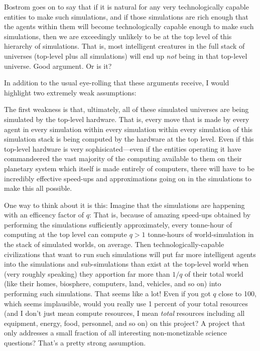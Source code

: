 \documentclass[12pt,letterpaper]{article}
\begin{document}
Bostrom goes on to say that if it is natural for any very
technologically capable entities to make such simulations, and if
those simulations are rich enough that the agents within them will
become technologically capable enough to make such simulations, then
we are exceedingly unlikely to be at the top level of this hierarchy
of simulations. That is, most intelligent creatures in the full stack
of universes (top-level plus all simulations) will end up \emph{not}
being in that top-level universe. Good argument. Or is it?

In addition to the usual eye-rolling that these arguments receive, I
would highlight two extremely weak assumptions:

The first weakness is that, ultimately, all of these simulated
universes are being simulated by the top-level hardware. That is,
every move that is made by every agent in every simulation within
every simulation within every simulation of this simulation stack is
being computed by the hardware at the top level. Even if this
top-level hardware is very sophisicated---even if the entities
operating it have commandeered the vast majority of the computing
available to them on their planetary system which itself is made
entirely of computers, there will have to be incredibly effective
speed-ups and approximations going on in the simulations to make this
all possible.

One way to think about it is this: Imagine that the simulations are
happening with an efficency factor of $q$: That is, because of amazing
speed-ups obtained by performing the simulations sufficiently
approximately, every tonne-hour of computing at the top level can
compute $q>1$ tonne-hours of world-simulation in the stack of
simulated worlds, on average. Then technologically-capable
civilizations that want to run such simulations will put far more
intelligent agents into the simulations and sub-simulations than exist
at the top-level world when (very roughly speaking) they apportion far
more than $1/q$ of their total world (like their homes, biosphere,
computers, land, vehicles, and so on) into performing such
simulations. That seems like a lot! Even if you got $q$ close to 100,
which seems implausible, would you really use 1 percent of your total
resources (and I don't just mean compute resources, I mean
\emph{total} resources including all equipment, energy, food,
personnel, and so on) on this project? A project that only addresses a
small fraction of all interesting non-monetizable science questions?
That's a pretty strong assumption.
\end{document}
